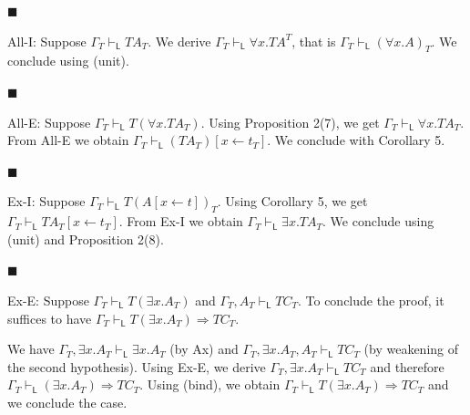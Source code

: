 \documentclass[10pt,a4paper]{article}
\begin{document}
 
 
\par\noindent  $\blacksquare$ 
 
All-I: Suppose $\Gamma_{T}\vdash_{\mathsf{L}}TA_{T}$. We derive $\Gamma_{T}\vdash_{\mathsf{L}}{\forall}x.TA^{T}$, that is $\Gamma_{T}\vdash_{\mathsf{L}}({\forall}x.A)_{T}$. We conclude using (unit).\par
 
 
 
\par\noindent  $\blacksquare$ 
 
All-E: Suppose $\Gamma_{T}\vdash_{\mathsf{L}}T({\forall}x.TA_{T})$. Using Proposition 2(7), we get $\Gamma_{T}\vdash_{\mathsf{L}}{\forall}x.TA_{T}$. From All-E we obtain $\Gamma_{T}\vdash_{\mathsf{L}}(TA_{T})[x\leftarrow t_{T}]$. We conclude with Corollary 5.\par
 
 
 
\par\noindent  $\blacksquare$ 
 
Ex-I: Suppose $\Gamma_{T}\vdash_{\mathsf{L}}T(A[x\leftarrow t])_{T}$. Using Corollary 5, we get $\Gamma_{T}\vdash_{\mathsf{L}}TA_{T}[x\leftarrow t_{T}]$. From Ex-I we obtain $\Gamma_{T}\vdash_{\mathsf{L}}{\exists}x.TA_{T}$. We conclude using (unit) and Proposition 2(8).\par
 
 
 
\par\noindent  $\blacksquare$ 
 
Ex-E: Suppose $\Gamma_{T}\vdash_{\mathsf{L}}T({\exists}x.A_{T})$ and $\Gamma_{T},A_{T}\vdash_{\mathsf{L}}TC_{T}$. To conclude the proof, it suffices to have $\Gamma_{T}\vdash_{\mathsf{L}}T({\exists}x.A_{T})\mathbin{\Rightarrow}TC_{T}$.\par
 
 
 
We have $\Gamma_{T},{\exists}x.A_{T}\vdash_{\mathsf{L}}{\exists}x.A_{T}$ (by Ax) and $\Gamma_{T},{\exists}x.A_{T},A_{T}\vdash_{\mathsf{L}}TC_{T}$ (by weakening of the second hypothesis). Using Ex-E, we derive $\Gamma_{T},{\exists}x.A_{T}\vdash_{\mathsf{L}}TC_{T}$ and therefore $\Gamma_{T}\vdash_{\mathsf{L}}({\exists}x.A_{T})\mathbin{\Rightarrow}TC_{T}$. Using (bind), we obtain $\Gamma_{T}\vdash_{\mathsf{L}}T({\exists}x.A_{T})\mathbin{\Rightarrow}TC_{T}$ and we conclude the case.\par
 
\end{document}
